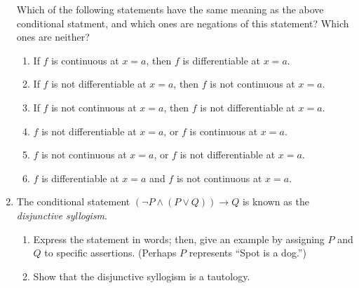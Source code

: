 \documentclass[letterpaper,12pt]{article}
\begin{document}
\begin{enumerate}
Which of the following statements have the same meaning as the above conditional statment, and which ones are negations of this statement? Which ones are neither?
\begin{enumerate}
 \item If $f$ is continuous at $x=a$, then $f$ is differentiable at $x=a$.
 \item If $f$ is not differentiable at $x=a$, then $f$ is not continuous at $x=a$.
 \item If $f$ is not continuous at $x=a$, then $f$ is not differentiable at $x=a$.
 \item $f$ is not differentiable at $x=a$, or $f$ is continuous at $x=a$.
 \item $f$ is not continuous at $x=a$, or $f$ is not differentiable at $x=a$.
 \item $f$ is differentiable at $x=a$ and $f$ is not continuous at $x=a$.
\end{enumerate}
\item The conditional statement $(\neg P \wedge (P\vee Q))\to Q$ is known as the {\em disjunctive syllogism}.
\begin{enumerate}
\item Express the statement in words; then, give an example by assigning $P$ and $Q$ to specific assertions. (Perhaps $P$ represents ``Spot is a dog.'')
\item Show that the disjunctive syllogism is a tautology.
\end{enumerate}
\end{enumerate}

\end{document}
